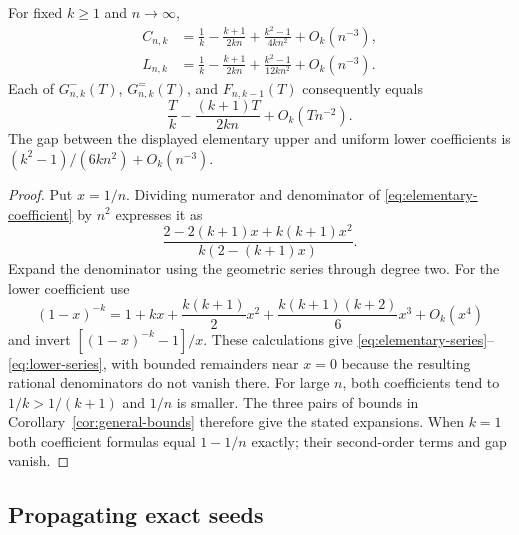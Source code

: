 \begin{proposition}\label{prop:general-asymptotics}
For fixed $k\ge1$ and $n\to\infty$,
\begin{align}
 C_{n,k}&=\frac1k-\frac{k+1}{2kn}
                 +\frac{k^2-1}{4kn^2}+O_k(n^{-3}),
                 \label{eq:elementary-series}\\
 L_{n,k}&=\frac1k-\frac{k+1}{2kn}
                 +\frac{k^2-1}{12kn^2}+O_k(n^{-3}).
                 \label{eq:lower-series}
\end{align}
Each of $G^-_{n,k}(T)$, $G^=_{n,k}(T)$, and $F_{n,k-1}(T)$ consequently
equals
\begin{equation}\label{eq:sharp-first-correction}
 \frac Tk-\frac{(k+1)T}{2kn}+O_k(Tn^{-2}).
\end{equation}
The gap between the displayed elementary upper and uniform lower
coefficients is $(k^2-1)/(6kn^2)+O_k(n^{-3})$.
\end{proposition}
\begin{proof}
Put $x=1/n$. Dividing numerator and denominator of
\eqref{eq:elementary-coefficient} by $n^2$ expresses it as
\[
 \frac{2-2(k+1)x+k(k+1)x^2}{k(2-(k+1)x)}.
\]
Expand the denominator using the geometric series through degree two.
For the lower coefficient use
\[
 (1-x)^{-k}=1+kx+\frac{k(k+1)}2x^2
             +\frac{k(k+1)(k+2)}6x^3+O_k(x^4)
\]
and invert $[(1-x)^{-k}-1]/x$. These calculations give
\eqref{eq:elementary-series}--\eqref{eq:lower-series}, with bounded
remainders near $x=0$ because the resulting rational denominators do not
vanish there. For large $n$, both coefficients tend to $1/k>1/(k+1)$
and $1/n$ is smaller. The three pairs of bounds in
Corollary~\ref{cor:general-bounds} therefore give the stated expansions.
When $k=1$ both coefficient formulas equal $1-1/n$ exactly; their
second-order terms and gap vanish.
\end{proof}

\subsection{Propagating exact seeds}\label{subsec:seeded}

